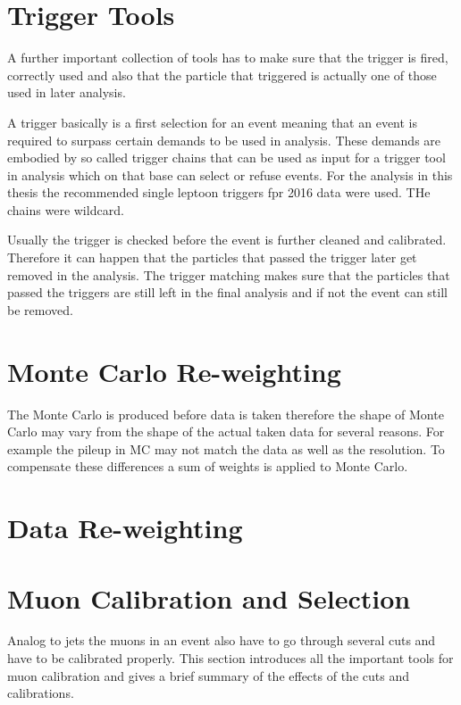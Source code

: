 \section{Trigger Tools}

A further important collection of tools has to make sure that the trigger is fired, correctly used and also that the particle that triggered is actually one of those used in later analysis.

A trigger basically is a first selection for an event meaning that an event is required to surpass certain demands to be used in analysis. These demands are embodied by so called trigger chains that can be used as input for a trigger tool in analysis which on that base can select or refuse events. For the analysis in this thesis the recommended single leptoon triggers fpr 2016 data were used. THe chains were wildcard.

Usually the trigger is checked before the event is further cleaned and calibrated. Therefore it can happen that the particles that passed the trigger later get removed in the analysis. The trigger matching makes sure that the particles that passed the triggers are still left in the final analysis and if not the event can still be removed.

\section{Monte Carlo Re-weighting}

The Monte Carlo is produced before data is taken therefore the shape of Monte Carlo may vary from the shape of the actual taken data for several reasons. For example the pileup in MC may not match the data as well as the resolution. To compensate these differences a sum of weights is applied to Monte Carlo.

\section{Data Re-weighting}

\section{Muon Calibration and Selection}

Analog to jets the muons in an event also have to go through several cuts and have to be calibrated properly. This section introduces all the important tools for muon calibration and gives a brief summary of the effects of the cuts and calibrations.

